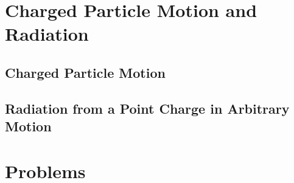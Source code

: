 \section{Charged Particle Motion and Radiation}

\subsection{Charged Particle Motion}

\subsection{Radiation from a Point Charge in Arbitrary Motion}


\section*{Problems}


